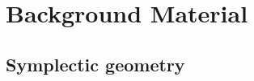 \documentclass[beamer,10pt]{standalone}
\begin{document}

\section{Background Material}


\subsection{Symplectic geometry}
\end{document}

